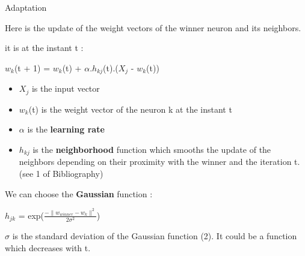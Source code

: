 \documentclass{beamer}
\begin{document}
	\begin{frame}{Adaptation}

Here is the update of the weight vectors of the winner neuron and its neighbors.

it is at the instant t : 

		\begin{center}

			$w_k$(t + 1) = $w_k$(t) + $\alpha$.$h_{kj}$(t).($X_j$ - $w_k$(t))	
		\end{center}

		\begin{itemize}
	
			\item $X_j$ is the input vector
			\item $w_k$(t) is the weight vector of the neuron k at the instant t
			\item $\alpha$ is the \textbf{learning rate}
			\item $h_{kj}$ is the \textbf{neighborhood} function which smooths the update of the neighbors depending on their proximity with the winner and the iteration t. (see 1 of Bibliography)
		\end{itemize}
	
We can choose the \textbf{Gaussian} function :

			\begin{center}
		
				$h_{jk}$ = exp($\frac{-\|w_{winner} - w_k\|^2}{2\sigma^2}$)
			\end{center}
		
$\sigma$ is the standard deviation of the Gaussian function (2). It could be a function which decreases with t.
	\end{frame}
\end{document}
